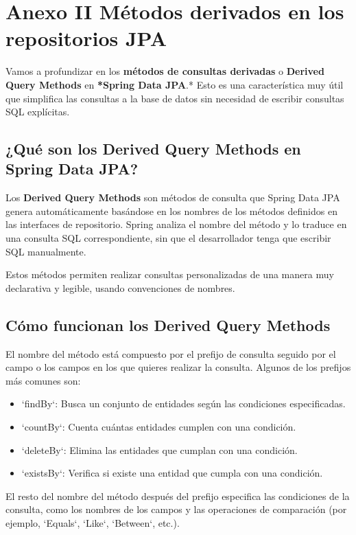 \documentclass[11pt]{article}
\begin{document}
\section{Anexo II  Métodos derivados en los repositorios JPA}
\label{sec:org91befe6}
Vamos a profundizar en los \textbf{\textbf{métodos de consultas derivadas}} o \textbf{\textbf{Derived Query Methods}} en \textbf{*Spring Data JPA}.*
Esto es una característica muy útil que simplifica las consultas a la base de datos sin necesidad de escribir consultas SQL explícitas.

\subsection{¿Qué son los Derived Query Methods en Spring Data JPA?}
\label{sec:orge217bc8}
Los \textbf{\textbf{Derived Query Methods}} son métodos de consulta que Spring Data JPA genera automáticamente basándose en los nombres de los métodos definidos en las interfaces de repositorio. Spring analiza el nombre del método y lo traduce en una consulta SQL correspondiente, sin que el desarrollador tenga que escribir SQL manualmente.

Estos métodos permiten realizar consultas personalizadas de una manera muy declarativa y legible, usando convenciones de nombres.

\subsection{Cómo funcionan los Derived Query Methods}
\label{sec:org31d8b95}
El nombre del método está compuesto por el prefijo de consulta seguido por el campo o los campos en los que quieres realizar la consulta. Algunos de los prefijos más comunes son:

\begin{itemize}
\item `findBy`: Busca un conjunto de entidades según las condiciones especificadas.
\item `countBy`: Cuenta cuántas entidades cumplen con una condición.
\item `deleteBy`: Elimina las entidades que cumplan con una condición.
\item `existsBy`: Verifica si existe una entidad que cumpla con una condición.
\end{itemize}

El resto del nombre del método después del prefijo especifica las condiciones de la consulta, como los nombres de los campos y las operaciones de comparación (por ejemplo, `Equals`, `Like`, `Between`, etc.).
\end{document}
